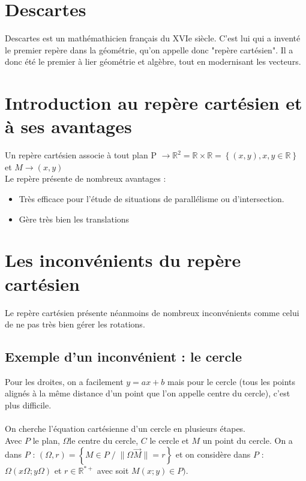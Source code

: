 \documentclass{report}
\begin{document}
\section{Descartes}
Descartes est un mathémathicien français du XVIe siècle. C'est lui qui a inventé le premier repère dans la géométrie, qu'on appelle donc "repère cartésien". Il a donc été le premier à lier géométrie et algèbre, tout en modernisant les vecteurs. 

\section{Introduction au repère cartésien et à ses avantages}
Un repère cartésien associe à tout plan P
    \begin{math}
        \rightarrow \mathbb{R}^2 = \mathbb{R} \times \mathbb{R} = \left \{(x, y), x, y \in \mathbb{R} \right \} 
    \end{math}
    et 
    \begin{math}
         M \rightarrow (x, y)
    \end{math} \\
Le repère présente de nombreux avantages : \begin{itemize}
    \item Très efficace pour l'étude de situations de parallélisme ou d'intersection.
    \item Gère très bien les translations 
\end{itemize}

\section{Les inconvénients du repère cartésien}

Le repère cartésien présente néanmoins de nombreux inconvénients comme celui de ne pas très bien gérer les rotations.

\subsection{Exemple d'un inconvénient : le cercle}
Pour les droites, on a facilement $y = ax + b$ mais pour le cercle (tous les points alignés à la même distance d'un point que l'on appelle centre du cercle), c'est plus difficile. \\ \\
On cherche l'équation cartésienne d'un cercle en plusieurs étapes. \\
Avec $P$ le plan, $\Omega$le centre du cercle, $C$ le cercle et $M$ un point du cercle. On a dans $P$ : 
$(\Omega,r) = \left\{ M \in P \; / \; \|\Omega \vec M \| = r \right\}$ et on considère dans $P$ : $\Omega (x\Omega ; y\Omega)$ et $r \in \mathbb{R}^{*+}$ avec soit $M(x ; y) \in P)$. \\
\end{document}
